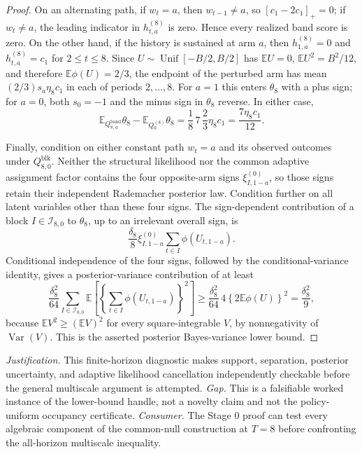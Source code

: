 \documentclass{article}
\begin{document}
\begin{proof}
On an alternating path, if \(w_t=a\), then \(w_{t-1}\ne a\), so
\([c_1-2c_1]_+=0\); if \(w_t\ne a\), the leading indicator in \(h_{t,a}^{(8)}\) is zero.  Hence every realized band score is zero.  On the other hand, if the history is sustained at arm \(a\), then \(h_{1,a}^{(8)}=0\) and \(h_{t,a}^{(8)}=c_1\) for \(2\le t\le8\).  Since \(U\sim\operatorname{Unif}[-B/2,B/2]\) has \(\mathbb EU=0\), \(\mathbb EU^2=B^2/12\), and therefore \(\mathbb E\phi(U)=2/3\), the endpoint of the perturbed arm has mean \((2/3)s_a\eta_8c_1\) in each of periods \(2,\ldots,8\).  For \(a=1\) this enters \(\theta_8\) with a plus sign; for \(a=0\), both \(s_0=-1\) and the minus sign in \(\theta_8\) reverse.  In either case,
\[
 \mathbb E_{Q_{8,a}^{\mathrm{band}}}\theta_8
 -\mathbb E_{Q_0^{(8)}}\theta_8
 =\frac18\,7\,\frac23\eta_8c_1
 =\frac{7\eta_8c_1}{12}.
\]

Finally, condition on either constant path \(w_t=a\) and its observed outcomes under \(Q_{8,0}^{\mathrm{blk}}\).  Neither the structural likelihood nor the common adaptive assignment factor contains the four opposite-arm signs \(\xi_{I,1-a}^{(0)}\), so those signs retain their independent Rademacher posterior law.  Condition further on all latent variables other than these four signs.  The sign-dependent contribution of a block \(I\in\mathcal I_{8,0}\) to \(\theta_8\), up to an irrelevant overall sign, is
\[
 \frac{\delta_8}{8}\xi_{I,1-a}^{(0)}
 \sum_{t\in I}\phi(U_{t,1-a}).
\]
Conditional independence of the four signs, followed by the conditional-variance identity, gives a posterior-variance contribution of at least
\[
 \frac{\delta_8^2}{64}
 \sum_{I\in\mathcal I_{8,0}}
 \mathbb E\!\left[\left\{\sum_{t\in I}
 \phi(U_{t,1-a})\right\}^2\right]
 \ge \frac{\delta_8^2}{64}\,4
 \left\{2\mathbb E\phi(U)\right\}^2
 =\frac{\delta_8^2}{9},
\]
because \(\mathbb EV^2\ge(\mathbb EV)^2\) for every square-integrable \(V\), by nonnegativity of \(\operatorname{Var}(V)\).  This is the asserted posterior Bayes-variance lower bound.
\end{proof}
\par\smallskip\noindent \textit{Justification.} This finite-horizon diagnostic makes support, separation, posterior uncertainty, and adaptive likelihood cancellation independently checkable before the general multiscale argument is attempted. \textit{Gap.} This is a falsifiable worked instance of the lower-bound handle, not a novelty claim and not the policy-uniform occupancy certificate. \textit{Consumer.} The Stage 0 proof can test every algebraic component of the common-null construction at \(T=8\) before confronting the all-horizon multiscale inequality.
\end{document}
